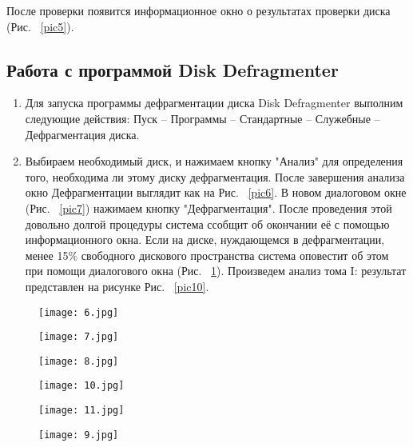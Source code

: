 После проверки появится информационное окно о результатах проверки диска (Рис. ~\ref{pic5}).


\subsection{Работа с программой Disk Defragmenter}

\begin{enumerate}
\item
Для запуска программы дефрагментации диска Disk Defragmenter выполним следующие действия: Пуск -- Программы -- Стандартные -- Служебные -- Дефрагментация диска.
\item
Выбираем необходимый диск, и нажимаем кнопку "Анализ" для определения того, необходима ли этому диску дефрагментация. После завершения анализа окно Дефрагментации выглядит как на Рис. ~\ref{pic6}. В новом диалоговом окне (Рис. ~\ref{pic7}) нажимаем кнопку "Дефрагментация". После проведения этой довольно долгой процедуры система ссобщит об окончании её с помощью информационного окна. Если на диске, нуждающемся в дефрагментации,  менее 15\% свободного дискового пространства система оповестит об этом при помощи диалогового окна (Рис. ~\ref{pic9}).
Произведем анализ тома I: результат представлен на рисунке Рис. ~\ref{pic10}.
\end{enumerate}

\begin{figure}[h!t] 
  \begin{center}

  \begin{minipage}[h]{0.4\linewidth}
  \texttt{[image: 6.jpg]}
  \caption{\label{pic6}}
  
  \bigskip
  
  \texttt{[image: 7.jpg]}
  \caption{\label{pic7}}
  
  \bigskip
  
  \texttt{[image: 8.jpg]}
  \caption{\label{pic8}}

  \end{minipage}
  \hfill   
  \begin{minipage}[h]{0.4\linewidth}
  
  \texttt{[image: 10.jpg]}
  \caption{\label{pic10}}

  \bigskip
  
  \texttt{[image: 11.jpg]}
  \caption{\label{pic11}}

  \end{minipage}    
  \begin{minipage}[h]{1\linewidth}	        
 
  \texttt{[image: 9.jpg]}
  \caption{\label{pic9}}
  
  \end{minipage}        
  \end{center}
\end{figure}


